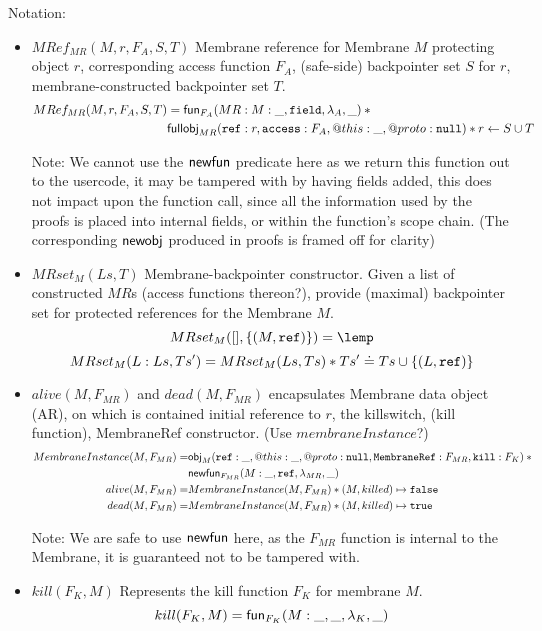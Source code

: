 \documentclass[a4paper,notitlepage]{report}
\begin{document}
Notation:
\begin{itemize}
  \item $MRef_{MR}(M,r,F_A,S,T)$ \qquad Membrane reference for Membrane $M$ protecting object
$r$, corresponding access function $F_A$, (safe-side) backpointer set $S$ for
$r$, membrane-constructed backpointer set $T$.
\begin{align*}
  MRef_{MR}(M,r,F_A,S,T) &= \mathsf{fun}_{F_A}(MR:M:\_, \mathtt{field}, \lambda_A, \_) \mathbin{*} {} \\
                         & \mathsf{fullobj}_{MR}(\mathtt{ref}: r, \mathtt{access}: F_A, @this: \_, @proto: \mathtt{null}) \mathbin{*}
    r \leftarrow S \cup T
\end{align*}

Note: We cannot use the $\mathsf{newfun}$ predicate here as we return this function out
to the usercode, it may be tampered with by having fields added, this does not
impact upon the function call, since all the information used by the proofs is
placed into internal fields, or within the function's scope chain.
(The corresponding $\mathsf{newobj}$ produced in proofs is framed off for clarity)

  \item $MRset_M(Ls,T)$ \qquad Membrane-backpointer constructor. Given a list of
constructed $MR$s (access functions thereon?), provide (maximal) backpointer set
for protected references for the Membrane $M$.
\[ MRset_M([], \{(M, \js{ref})\}) = \lemp \]
\[ MRset_M(L:Ls, Ts') = MRset_M(Ls, Ts) \mathbin{*} Ts' \doteq Ts \cup \{(L, \mathtt{ref})\}\]

  \item $alive(M, F_{MR})$ and $dead(M, F_{MR})$ \qquad encapsulates Membrane data object (AR),
    on which is contained initial reference to $r$, the killswitch, (kill
    function), MembraneRef constructor. (Use $membraneInstance$?)
    \begin{align*}
      MembraneInstance(M, F_{MR}) =& \mathsf{obj}_M(\mathtt{ref}: \_, @this: \_, @proto: \mathtt{null},
      \mathtt{MembraneRef}: F_{MR}, \mathtt{kill}: F_{K}) \mathbin{*} {} \\
  & \mathsf{newfun}_{F_{MR}}(M:\_, \mathtt{ref}, \lambda_{MR}, \_) \\
alive(M, F_{MR}) =& MembraneInstance(M, F_{MR}) \mathbin{*} (M, killed) \mapsto \texttt{false} \\
 dead(M, F_{MR}) =& MembraneInstance(M, F_{MR}) \mathbin{*} (M, killed) \mapsto \texttt{true}
    \end{align*}

    Note: We are safe to use $\mathsf{newfun}$ here, as the $F_{MR}$ function is
    internal to the Membrane, it is guaranteed not to be tampered with.

  \item $kill(F_K, M)$ \qquad Represents the kill function $F_K$ for membrane $M$.
\[ kill(F_K, M) = \mathsf{fun}_{F_K}(M:\_, \_ , \lambda_K, \_) \]

\end{itemize}
\end{document}
